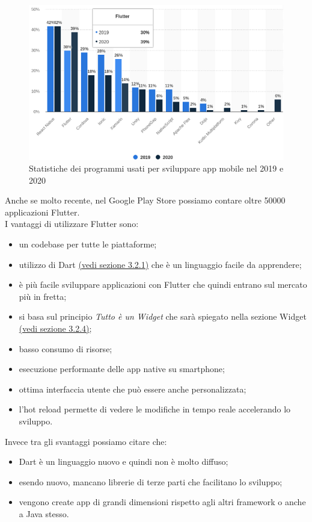 \begin{figure}[htbp]	
	\centering
	\includegraphics[width=12cm]{immagini/statisticheflutter.png}
	\caption{Statistiche dei programmi usati per sviluppare app mobile nel 2019 e 2020 \cite{stat}}
	\label{fig:Statistiche dei programmi usati per sviluppare app mobile nel 2019 e 2020} 
\end{figure}
\newpage
Anche se molto recente, nel Google Play Store possiamo contare oltre 50000 applicazioni Flutter.\\
I vantaggi di utilizzare Flutter sono:
\begin{itemize}
	\item un codebase per tutte le piattaforme; 
	\item utilizzo di Dart \hyperref[sec:Dart]{(vedi sezione 3.2.1)} che è un linguaggio facile da apprendere;  
	\item è più facile sviluppare applicazioni con Flutter che quindi entrano sul mercato più in fretta;
	\item si basa sul principio \textit{Tutto è un Widget} che sarà spiegato nella sezione Widget \hyperref[sec:Widget]{(vedi sezione 3.2.4)};
	\item basso consumo di risorse;
	\item esecuzione performante delle app native su smartphone;
	\item ottima interfaccia utente che può essere anche personalizzata;
	\item l’hot reload permette di vedere le modifiche in tempo reale accelerando lo sviluppo.\\
\end{itemize}
Invece tra gli svantaggi possiamo citare che:
\begin{itemize}
	\item Dart è un linguaggio nuovo e quindi non è molto diffuso; 
	\item esendo nuovo, mancano librerie di terze parti che facilitano lo sviluppo;  
	\item vengono create app di grandi dimensioni rispetto agli altri framework o anche a Java stesso.\\
\end{itemize}
